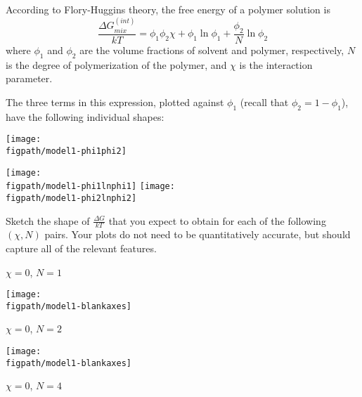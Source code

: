 \begin{activity}
\begin{instructornotes}
\end{instructornotes}


\begin{model}

According to Flory-Huggins theory, the free energy of a polymer solution is
\begin{equation*}
	\frac{\Delta G_{mix}^{(int)}}{kT} = \phi_1 \phi_2 \chi + \phi_1 \ln \phi_1 + \frac{\phi_2}{N}\ln \phi_2
\end{equation*}
where $\phi_1$ and $\phi_2$ are the volume fractions of solvent and polymer, respectively, $N$ is the degree of polymerization of the polymer, and $\chi$ is the interaction parameter.

The three terms in this expression, plotted against $\phi_1$ (recall that $\phi_2=1-\phi_1$), have the following individual shapes:

\centerline{
	\texttt{[image: \\figpath/model1-phi1phi2]}}
	
\centerline{
	\texttt{[image: \\figpath/model1-phi1lnphi1]}
	\texttt{[image: \\figpath/model1-phi2lnphi2]}
}

\end{model}

\begin{ctqs}

	\question Sketch the shape of $\frac{\Delta G}{kT}$ that you expect to obtain for each of the following $(\chi,N)$ pairs.  Your plots do not need to be quantitatively accurate, but should capture all of the relevant features.
	
		\vspace{0.05in}
		\begin{minipage}{0.3\textwidth}
			\centerline{$\chi = 0$, $N = 1$}
			
			\centerline{\texttt{[image: \\figpath/model1-blankaxes]}}
		\end{minipage}
		\begin{minipage}{0.3\textwidth}
			\centerline{$\chi = 0$, $N = 2$}
			
			\centerline{\texttt{[image: \\figpath/model1-blankaxes]}}
		\end{minipage}
		\begin{minipage}{0.3\textwidth}
			\centerline{$\chi = 0$, $N = 4$}
			

\end{minipage}
\end{ctqs}
\end{activity}
